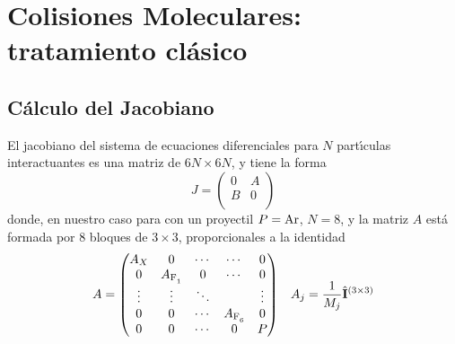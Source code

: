 
\chapter{Colisiones Moleculares: tratamiento cl\'{a}sico}
\label{C:colis-molec}

\section{C\'{a}lculo del Jacobiano}
\label{S:calc-jacob}

El jacobiano del sistema de ecuaciones diferenciales para $N$ part\'{\i}culas interactuantes es una matriz de $6N \times 6N$, y tiene la forma
\begin{equation}
  \label{Q:Jacob-ec-dif}
  J =
  \begin{pmatrix}
    0 & A \\
    B & 0 \\
  \end{pmatrix}
\end{equation}
donde, en nuestro caso para  con un proyectil $P=\ce{Ar}$, $N=8$, y la matriz $A$ est\'{a} formada por 8 bloques de $3 \times 3$, proporcionales a la identidad
\begin{align}
  \label{Q:Jacob-ec-dif-A}
  A &=
\begin{pmatrix}
  A_{X} & 0 & \cdots &  \cdots & 0 \\
  0 & A_{\ce{F1}}& 0 & \cdots & 0 \\
  \vdots  & \vdots  & \ddots &  & \vdots  \\
  0 &  0 &\cdots &  A_{\ce{F6}} & 0 \\
  0 & 0 & \cdots & 0 & P
\end{pmatrix}    &A_{j} = \frac{1}{M_{j}} \oper{I}^{(3\times 3)}
\end{align}


